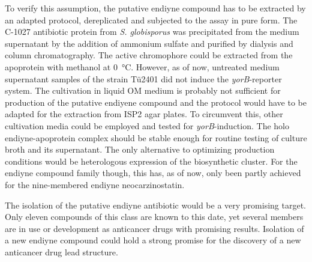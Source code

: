 	 To verify this assumption, the putative endiyne compound has to be extracted by an adapted protocol, dereplicated and subjected to the assay in pure form.
	 The C-1027 antibiotic protein from \textit{S. globisporus} was precipitated from the medium supernatant by the addition of ammonium sulfate and purified by dialysis and column chromatography.\autocite{Otani1988a}
	 The active chromophore could be extracted from the apoprotein with methanol at \SI{0}{\celsius}.\autocite{Matsumoto1993}
	 However, as of now, untreated medium supernatant samples of the strain Tü2401 did not induce the \textit{yorB}-reporter system.
	 The cultivation in liquid OM medium is probably not sufficient for production of the putative endiyene compound and the protocol would have to be adapted for the extraction from ISP2 agar plates.
	 To circumvent this, other cultivation media could be employed and tested for \textit{yorB}-induction.
	 The holo endiyne-apoprotein complex should be stable enough for routine testing of culture broth and its supernatant.
	 The only alternative to optimizing production conditions would be heterologous expression of the biosynthetic cluster.
	 For the endiyne compound family though, this has, as of now, only been partly achieved for the nine-membered endiyne neocarzinostatin.\autocite{Zhang2008}
	 
	 The isolation of the putative endiyne antibiotic would be a very promising target.
	 Only eleven compounds of this class are known to this date, yet several members are in use or development as anticancer drugs with promising results.\autocite{Liang2010,Galm2005}
	 Isolation of a new endiyne compound could  hold a strong promise for the discovery of a new anticancer drug lead structure.
	 


